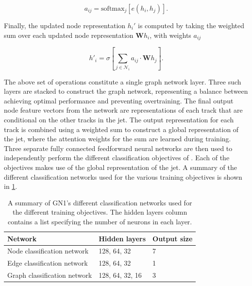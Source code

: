 \begin{equation}\label{eq:attention weights}
    a_{ij} = \mathrm{softmax}_j \left[ e(h_i, h_j) \right].
\end{equation}

Finally, the updated node representation $h_i'$ is computed by taking the weighted sum over each updated node representation $\mathbf{W} h_i$, with weights $a_{ij}$

\begin{equation}\label{eq:updated_node_rep}
    h'_i = \sigma \left[ \sum_{j \in \mathcal{N}_i}{a_{ij} \cdot \mathbf{W} {h}_j}  \right].
\end{equation}

The above set of operations constitute a single graph network layer. 
Three such layers are stacked to construct the graph network, representing a balance between achieving optimal performance and preventing overtraining.
The final output node feature vectors from the network are representations of each track that are conditional on the other tracks in the jet.
The output representation for each track is combined using a weighted sum to construct a global representation of the jet, where the attention weights for the sum are learned during training.
Three separate fully connected feedforward neural networks are then used to independently perform the different classification objectives of \GNN.
Each of the objectives makes use of the global representation of the jet.
A summary of the different classification networks used for the various training objectives is shown in \cref{tab:architecture}.

\begin{table}[!htbp]
  \footnotesize\centering
  \setlength{\tabcolsep}{0.5em} %
  \caption{
      A summary of GN1's different classification networks used for the different training objectives.
      The hidden layers column contains a list specifying the number of neurons in each layer.
      }
  \begin{tabular}{lll}
      \toprule\hline 
      \textbf{Network} & \textbf{Hidden layers} & \textbf{Output size} \\
      \hline
      Node classification network    & 128, 64, 32 & 7 \\
      Edge classification network    & 128, 64, 32 & 1 \\
      Graph classification network   & 128, 64, 32, 16 & 3 \\
      \hline\bottomrule
  \end{tabular}
  \vspace{4mm}
  \label{tab:architecture}
\end{table}



